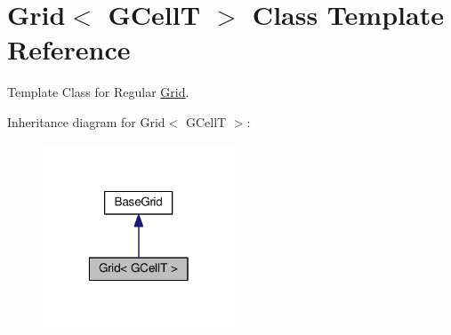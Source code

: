 \hypertarget{classKatabatic_1_1Grid}{}\section{Grid$<$ G\+CellT $>$ Class Template Reference}
\label{classKatabatic_1_1Grid}


Template Class for Regular \hyperlink{classKatabatic_1_1Grid}{Grid}.  




Inheritance diagram for Grid$<$ G\+CellT $>$\+:\nopagebreak
\begin{figure}[H]
\begin{center}
\leavevmode
\includegraphics[width=162pt]{classKatabatic_1_1Grid__inherit__graph}
\end{center}
\end{figure}
